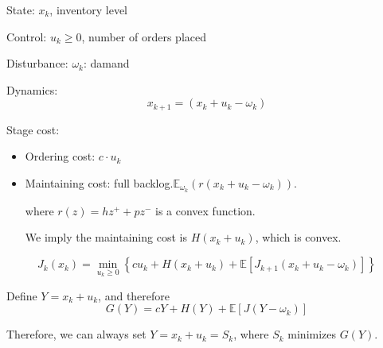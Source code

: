 State: $x_k$, inventory level

Control: $u_k\ge0$, number of orders placed

Disturbance: $\omega_k$: damand

Dynamics:
\[
x_{k+1 } = (x_k+u_k-\omega_k)
\]

Stage cost:
\begin{itemize}
\item
Ordering cost: $c\cdot u_k$
\item
Maintaining cost: full backlog.$ \mathbb{E}_{\omega_k}(r(x_k+u_k-\omega_k)).$

where $r(z) =hz^+ + pz^-$ is a convex function.

We imply the maintaining cost is $H(x_k+u_k)$, which is convex.
\end{itemize}

\[
J_k(x_k) = \min_{u_k\ge0}
\left\{
cu_k+H(x_k+u_k)
+
\mathbb{E}[J_{k+1}(x_k+u_k-\omega_k)]
\right\}
\]

Define $Y=x_k+u_k$, and therefore
\[
G(Y) = cY+H(Y)+\mathbb{E}[J(Y-\omega_k)]
\]

Therefore, we can always set $Y=x_k+u_k=S_k$, where $S_k$ minimizes $G(Y)$.









